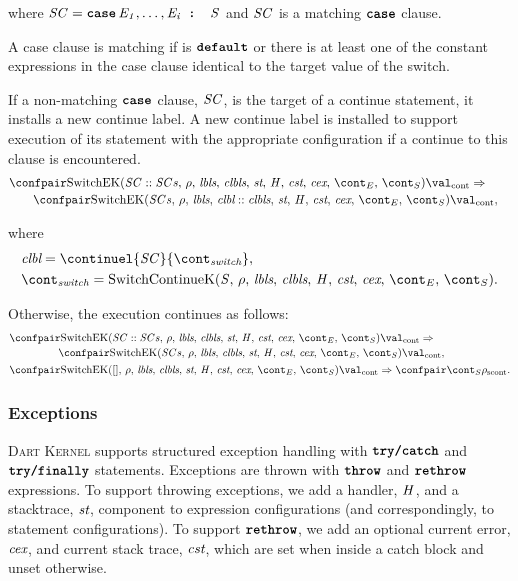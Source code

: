 \documentclass[a4paper,oneside,fleqn]{article}
\newcommand{\kernel}{\textsc{Dart Kernel}}
\newcommand{\synt}[1]{\ensuremath{\text{\textbf{\texttt{#1}}}}}
\DeclareMathOperator{\throw}{\synt{throw}}
\DeclareMathOperator{\rethrow}{\synt{rethrow}}
\DeclareMathOperator{\case}{\synt{case}}
\DeclareMathOperator{\default}{\synt{default}}
\newcommand{\cesktrans}[2]{\ensuremath{{#1} \Rightarrow {#2}}}
\newcommand{\cesktranssplit}[2]{\ensuremath{{#1} \Rightarrow\\ {#2}}}
\begin{document}
\noindent where $\scase = \case \expri{1}, \dots, \expri{i} \synt{ : } \stmt$ and $\mathit{SC}$ is a matching $\case$ clause.

A case clause is matching if is $\default$ or there is at least one of the constant expressions in the case clause identical to the target value of the switch.

If a non-matching $\case$ clause, $\mathit{SC}$, is the target of a continue statement, it installs a new continue label.
A new continue label is installed to support execution of its statement with the appropriate configuration if a continue to this clause is encountered.
\begin{align*}
    &\begin{multlined}
        \cesktranssplit
            {\contconf{\SwitchK{\scase :: \scases}{\clbls}}{\val}}%
            {\contconf{\SwitchK{\scases}{\clbl :: \clbls}}{\val}},
    \end{multlined}
\end{align*}

\noindent where
\begin{align*}
    &\clbl = \continuel{\scase}{\switchcont},\\
    &\switchcont = \ContinueK.
\end{align*}

Otherwise, the execution continues as follows:
\begin{align*}
    &\begin{multlined}
        \cesktranssplit%
            {\contconf{\SwitchK{\scase :: \scases}{\clbls}}{\val}}%
            {\contconf{\SwitchK{\scases}{\clbls}}{\val}},
    \end{multlined}\\
    &\cesktrans%
        {\contconf{\SwitchK{[]}{\clbls}}{\val}}%
        {\scontconf{\scont}{\env}}.
\end{align*}


\subsubsection{Exceptions}

\kernel{} supports structured exception handling with $\synt{try/catch}$ and $\synt{try/finally}$ statements.
Exceptions are thrown with $\throw$ and $\rethrow$ expressions.
To support throwing exceptions, we add a handler, $\mathit{H}$, and a stacktrace, $\textit{st}$, component to expression configurations (and correspondingly, to statement configurations).
To support $\rethrow$, we add an optional current error, $\textit{cex}$, and current stack trace, $\textit{cst}$, which are set when inside a catch block and unset otherwise.
\end{document}
